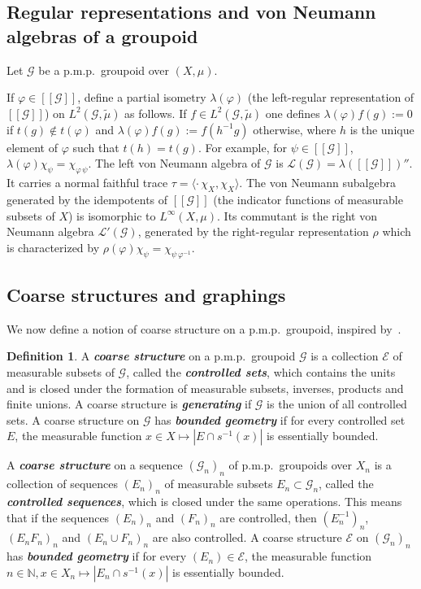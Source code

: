 \documentclass[10pt]{amsart}
\theoremstyle{definition}
\newtheorem{defi}[cdrthm]{Definition}
\newcommand{\defin}[1]{\textbf{\emph{#1}}}
\newcommand{\Nmath}{\mathbb{N}}
\newcommand{\coarse}{\mathcal{E}}
\newcommand{\LL}{\mathcal{L}}
\newcommand{\cg}{\mathcal{G}}
\newcommand{\ph}{\varphi}
\newcommand{\pmp}{p.m.p.\ }
\begin{document}
\subsection{Regular representations and von Neumann algebras of a groupoid}\label{sec:vn}

Let $\cg$ be a \pmp groupoid over $(X,\mu)$.

If $\ph\in [[\cg]]$, define a partial isometry $\lambda(\ph)$ (the left-regular representation of $[[\cg]]$) on $L^2(\cg,\widetilde \mu)$ as follows. If $f \in L^2(\cg,\widetilde \mu)$ one defines $\lambda(\ph)f(g) := 0$ if $t(g) \notin t(\ph)$ and $\lambda(\ph)f(g) := f(h^{-1}g)$ otherwise, where $h$ is the unique element of $\ph$ such that $t(h)=t(g)$. For example, for $\psi\in [[\cg]]$, $\lambda(\ph)\chi_\psi = \chi_{\ph\,\psi}$. The left von Neumann algebra of $\cg$ is $\LL(\cg)=\lambda([[\cg]])''$. It carries a normal faithful trace $\tau = \langle \cdot\,\chi_X,\chi_X\rangle$. The von Neumann subalgebra generated by the idempotents of $[[\cg]]$ (the indicator functions of measurable subsets of $X$) is isomorphic to $L^\infty(X,\mu)$. Its commutant is the right von Neumann algebra $\LL'(\cg)$, generated by the right-regular representation $\rho$ which is characterized by $\rho(\ph)\chi_\psi = \chi_{\psi\,\ph^{-1}}$.

\subsection{Coarse structures and graphings}\label{subsect : coarse structures and graphings}
We now define a notion of coarse structure on a \pmp groupoid, inspired by~\cite{Roe-2003}.
\begin{defi}
A \defin{coarse structure} on a \pmp groupoid $\cg$ is a collection $\coarse$ of measurable subsets of $\cg$, called the \defin{controlled sets}, which contains the units and is closed under the formation of measurable subsets, inverses, products and finite unions. A coarse structure is \defin{generating} if $\cg$ is the union of all controlled sets. A coarse structure on $\cg$ has
\defin{bounded geometry} if for every controlled set $E$, the measurable function $x \in X \mapsto |E \cap s^{-1}(x)|$ is essentially bounded.

A \defin{coarse structure} on a sequence $(\cg_n)_n$ of \pmp groupoids over $X_n$ is a collection of sequences $(E_n)_n$ of measurable subsets $E_n \subset \cg_n$, called the
\defin{controlled sequences}, which is closed under the same operations. This means that if the sequences $(E_n)_n$ and $(F_n)_n$ are controlled, then $(E_n^{-1})_n$, $(E_n F_n)_n$ and $(E_n \cup F_n)_n$ are also controlled. A coarse structure $\coarse$ on $(\cg_n)_n$ has \defin{bounded geometry} if for every $(E_n) \in \coarse$, the measurable function $n \in \Nmath,x \in X_n \mapsto |E_n \cap s^{-1}(x)|$ is essentially bounded.
\end{defi}
\end{document}
